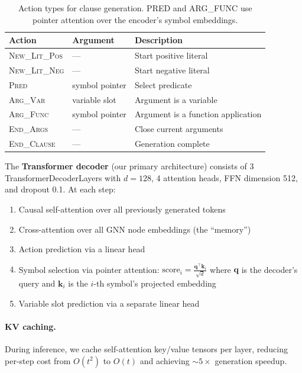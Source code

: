\documentclass{article}
\begin{document}
\begin{table}[t]
\centering
\caption{Action types for clause generation. PRED and ARG\_FUNC use pointer
attention over the encoder's symbol embeddings.}
\label{tab:actions}
\begin{tabular}{lll}
\toprule
\textbf{Action} & \textbf{Argument} & \textbf{Description} \\
\midrule
\textsc{New\_Lit\_Pos} & --- & Start positive literal \\
\textsc{New\_Lit\_Neg} & --- & Start negative literal \\
\textsc{Pred} & symbol pointer & Select predicate \\
\textsc{Arg\_Var} & variable slot & Argument is a variable \\
\textsc{Arg\_Func} & symbol pointer & Argument is a function application \\
\textsc{End\_Args} & --- & Close current arguments \\
\textsc{End\_Clause} & --- & Generation complete \\
\bottomrule
\end{tabular}
\end{table}

The \textbf{Transformer decoder} (our primary architecture) consists of 3
TransformerDecoderLayers with $d{=}128$, 4 attention heads, FFN dimension 512,
and dropout 0.1. At each step:
\begin{enumerate}
\item Causal self-attention over all previously generated tokens
\item Cross-attention over all GNN node embeddings (the ``memory'')
\item Action prediction via a linear head
\item Symbol selection via pointer attention:
      $\text{score}_i = \frac{\mathbf{q}^\top \mathbf{k}_i}{\sqrt{d}}$
      where $\mathbf{q}$ is the decoder's query and $\mathbf{k}_i$ is the
      $i$-th symbol's projected embedding
\item Variable slot prediction via a separate linear head
\end{enumerate}

\paragraph{KV caching.} During inference, we cache self-attention key/value
tensors per layer, reducing per-step cost from $O(t^2)$ to $O(t)$ and achieving
${\sim}5\times$ generation speedup.
\end{document}
